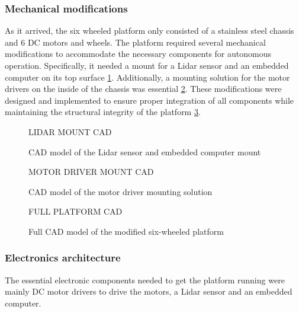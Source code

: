 \documentclass[11pt]{article}
\begin{document}
            \subsubsection{Mechanical modifications}
            As it arrived, the six wheeled platform only consisted of a stainless steel chassis and 6 DC motors and wheels. The platform required several mechanical modifications to accommodate the necessary components for autonomous operation. Specifically, it needed a mount for a Lidar sensor and an embedded computer on its top surface \ref{fig:lidar_mount}. Additionally, a mounting solution for the motor drivers on the inside of the chassis was essential \ref{fig:motor_driver_mount}. These modifications were designed and implemented to ensure proper integration of all components while maintaining the structural integrity of the platform \ref{fig:full_cad_model}.

            \begin{figure}[htbp]
                \centering
                LIDAR MOUNT CAD
                \caption{CAD model of the Lidar sensor and embedded computer mount}
                \label{fig:lidar_mount}
            \end{figure}
            
            \begin{figure}[htbp]
                \centering
                MOTOR DRIVER MOUNT CAD
                \caption{CAD model of the motor driver mounting solution}
                \label{fig:motor_driver_mount}
            \end{figure}
            
            \begin{figure}[htbp]
                \centering
                FULL PLATFORM CAD
                \caption{Full CAD model of the modified six-wheeled platform}
                \label{fig:full_cad_model}
            \end{figure}

            \subsubsection{Electronics architecture}
                The essential electronic components needed to get the platform running were mainly DC motor drivers to drive the motors, a Lidar sensor and an embedded computer.
                
\end{document}

